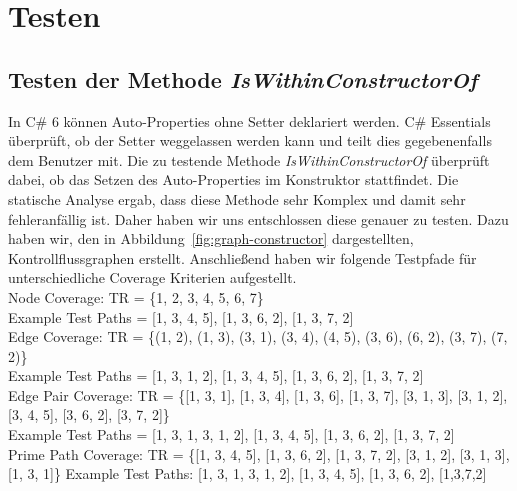 %
\section{Testen}

\subsection{Testen der Methode \textit{IsWithinConstructorOf}}
In C\# 6 können Auto-Properties ohne Setter deklariert werden. C\# Essentials überprüft, ob der Setter weggelassen werden kann und teilt dies gegebenenfalls dem Benutzer mit. Die zu testende Methode \textit{IsWithinConstructorOf} überprüft dabei, ob das Setzen des Auto-Properties im Konstruktor stattfindet. Die statische Analyse ergab, dass diese Methode sehr Komplex und damit sehr fehleranfällig ist. Daher haben wir uns entschlossen diese genauer zu testen. Dazu haben wir, den in Abbildung~\ref{fig:graph-constructor} dargestellten, Kontrollflussgraphen erstellt. Anschließend haben wir folgende Testpfade für unterschiedliche Coverage Kriterien aufgestellt.\\


Node Coverage: TR = \{1, 2, 3, 4, 5, 6, 7\}\\
Example Test Paths = [1, 3, 4, 5], [1, 3, 6, 2], [1, 3, 7, 2]\\

Edge Coverage: TR = \{(1, 2), (1, 3), (3, 1), (3, 4), (4, 5), (3, 6), (6, 2), (3, 7), (7, 2)\}\\
Example Test Paths = [1, 3, 1, 2], [1, 3, 4, 5], [1, 3, 6, 2], [1, 3, 7, 2]\\

Edge Pair Coverage: TR = \{[1, 3, 1], [1, 3, 4], [1, 3, 6], [1, 3, 7], [3, 1, 3], [3, 1, 2], [3, 4, 5], [3, 6, 2], [3, 7, 2]\}\\
Example Test Paths = [1, 3, 1, 3, 1, 2], [1, 3, 4, 5], [1, 3, 6, 2], [1, 3, 7, 2]\\

Prime Path Coverage: TR = \{[1, 3, 4, 5], [1, 3, 6, 2], [1, 3, 7, 2], [3, 1, 2], [3, 1, 3], [1, 3, 1]\}
Example Test Paths: [1, 3, 1, 3, 1, 2], [1, 3, 4, 5], [1, 3, 6, 2], [1,3,7,2]\\

